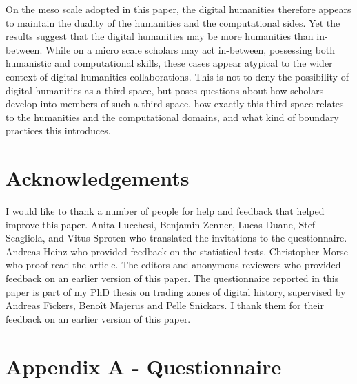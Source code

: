 \documentclass{article}
\begin{document}
On the meso scale adopted in this paper, the digital humanities therefore appears to maintain the duality of the humanities and the computational sides.
Yet the results suggest that the digital humanities may be more humanities than in-between.
While on a micro scale scholars may act in-between, possessing both humanistic and computational skills, these cases appear atypical to the wider context of digital humanities collaborations.
This is not to deny the possibility of digital humanities as a third space, but poses questions about how scholars develop into members of such a third space, how exactly this third space relates to the humanities and the computational domains, and what kind of boundary practices this introduces.

\section*{Acknowledgements}
I would like to thank a number of people for help and feedback that helped improve this paper.
Anita Lucchesi, Benjamin Zenner, Lucas Duane, Stef Scagliola, and Vitus Sproten who translated the invitations to the questionnaire.
Andreas Heinz who provided feedback on the statistical tests.
Christopher Morse who proof-read the article. 
The editors and anonymous reviewers who provided feedback on an earlier version of this paper.
The questionnaire reported in this paper is part of my PhD thesis on trading zones of digital history, supervised by Andreas Fickers, Beno\^it Majerus and Pelle Snickars. I thank them for their feedback on an earlier version of this paper. 




\newpage

\section*{Appendix A - Questionnaire}
\end{document}
